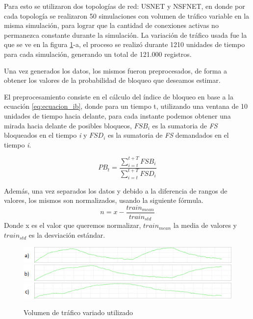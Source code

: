 Para esto se utilizaron dos topologías de red: USNET y NSFNET, en donde por cada topología se realizaron 50 simulaciones con volumen de  tráfico variable en la misma simulación, para lograr que la cantidad de conexiones activas no permanezca constante durante la simulación.  La variación de tráfico usada fue la que se ve en la figura \ref{fig:traficos}-a, el proceso se realizó durante 1210 unidades de tiempo para cada simulación, generando un total de 121.000 registros.

Una vez generados los datos, los mismos fueron preprocesados, de forma a obtener los valores de la probabilidad de bloqueo que deseamos estimar.

El preprocesamiento consiste en el cálculo del índice de bloqueo en base a la ecuación \ref{eq:ecuacion_ib}, donde para un tiempo t, utilizando una ventana de 10 unidades de tiempo hacia delante, para cada instante podemos obtener una mirada hacia delante de posibles bloqueos, \(FSB_{i}\) es la sumatoria de \textit{FS} bloqueados en el tiempo \textit{i} y \(FSD_{i}\) es la sumatoria de \textit{FS} demandados en el tiempo \textit{i}.

\begin{equation} \label{eq:ecuacion_ib}
        PB_{t} = \frac{\sum_{i=t}^{t+T}FSB_{i}}{\sum_{i=t}^{t+T}FSD_{i}}
\end{equation}

Además, una vez separados los datos y debido a la diferencia de rangos de valores, los mismos son normalizados, usando la siguiente fórmula.
\begin{equation}
    n = x - \frac{train_{mean}}{train_{std}}
\end{equation}
Donde x es el valor que queremos normalizar, \(train_{mean}\) la media de valores y \(train_{std}\) es la desviación estándar. 

\begin{figure}
    \centering
    \includegraphics[width=1\textwidth]{capitulos/img/trafico_1_a.png}
    \includegraphics[width=1\textwidth]{capitulos/img/trafico_2_b.png}
    \includegraphics[width=1\textwidth]{capitulos/img/trafico_3_c.png}
    \caption{Volumen de tráfico variado utilizado}
    \label{fig:traficos}
\end{figure}

